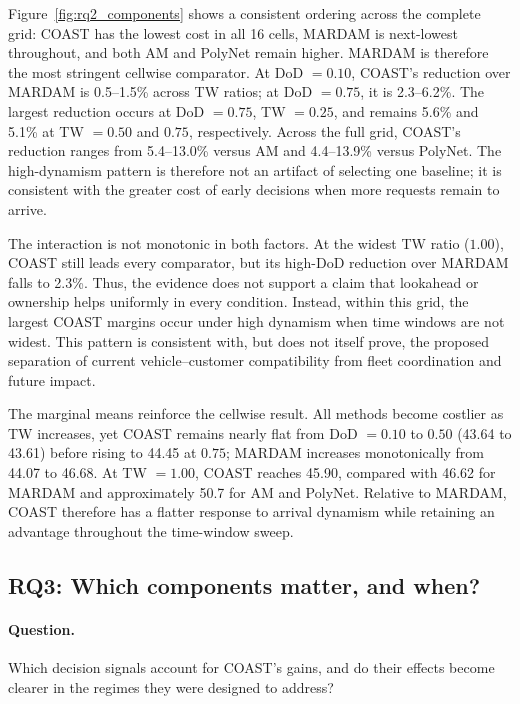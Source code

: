 \documentclass[letterpaper]{article}
\begin{document}
Figure~\ref{fig:rq2_components} shows a consistent ordering across the complete grid: COAST has the lowest cost in all 16 cells, MARDAM is next-lowest throughout, and both AM and PolyNet remain higher. MARDAM is therefore the most stringent cellwise comparator. At DoD $=0.10$, COAST's reduction over MARDAM is 0.5--1.5\% across TW ratios; at DoD $=0.75$, it is 2.3--6.2\%. The largest reduction occurs at DoD $=0.75$, TW $=0.25$, and remains 5.6\% and 5.1\% at TW $=0.50$ and $0.75$, respectively. Across the full grid, COAST's reduction ranges from 5.4--13.0\% versus AM and 4.4--13.9\% versus PolyNet. The high-dynamism pattern is therefore not an artifact of selecting one baseline; it is consistent with the greater cost of early decisions when more requests remain to arrive.

The interaction is not monotonic in both factors. At the widest TW ratio ($1.00$), COAST still leads every comparator, but its high-DoD reduction over MARDAM falls to 2.3\%. Thus, the evidence does not support a claim that lookahead or ownership helps uniformly in every condition. Instead, within this grid, the largest COAST margins occur under high dynamism when time windows are not widest. This pattern is consistent with, but does not itself prove, the proposed separation of current vehicle--customer compatibility from fleet coordination and future impact.

The marginal means reinforce the cellwise result. All methods become costlier as TW increases, yet COAST remains nearly flat from DoD $=0.10$ to $0.50$ (43.64 to 43.61) before rising to 44.45 at $0.75$; MARDAM increases monotonically from 44.07 to 46.68. At TW $=1.00$, COAST reaches 45.90, compared with 46.62 for MARDAM and approximately 50.7 for AM and PolyNet. Relative to MARDAM, COAST therefore has a flatter response to arrival dynamism while retaining an advantage throughout the time-window sweep.

\subsection{RQ3: Which components matter, and when?}

\paragraph{Question.} Which decision signals account for COAST's gains, and do their effects become clearer in the regimes they were designed to address?
\end{document}
